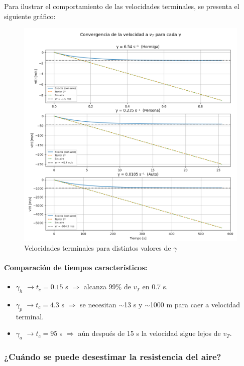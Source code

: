 \documentclass{article}
\begin{document}
Para ilustrar el comportamiento de las velocidades terminales, se presenta el siguiente gráfico:
\begin{figure}[H]
    \centering
    \includegraphics[width=1\textwidth]{assets/comportamiento_VT.png}
    \caption{Velocidades terminales para distintos valores de $\gamma$}
\end{figure}

\paragraph{Comparación de tiempos característicos:}

\begin{itemize}
    \item $\gamma_h$ $\rightarrow t_c = 0.15$ s $\Rightarrow$ alcanza 99\% de $v_T$ en 0.7 s.
    \item $\gamma_p$ $\rightarrow t_c = 4.3$ s $\Rightarrow$ se necesitan $\sim$13 s y $\sim$1000 m para caer a velocidad terminal.
    \item $\gamma_a$ $\rightarrow t_c = 95$ s $\Rightarrow$ aún después de 15 s la velocidad sigue lejos de $v_T$.
\end{itemize}

\subsubsection{¿Cuándo se puede desestimar la resistencia del aire?}
\end{document}
